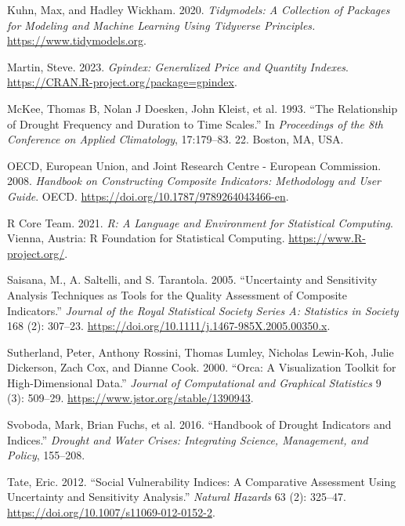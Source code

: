 \documentclass[
]{interact}
\newlength{\cslhangindent}
\newlength{\cslentryspacingunit} %
\newenvironment{CSLReferences}[2] %
 {%
  \setlength{\parindent}{0pt}
  \ifodd #1
  \let\oldpar\par
  \def\par{\hangindent=\cslhangindent\oldpar}
  \fi
  \setlength{\parskip}{#2\cslentryspacingunit}
 }%
 {}
\begin{document}
\begin{CSLReferences}{1}{0}
\leavevmode{}%
Kuhn, Max, and Hadley Wickham. 2020. \emph{Tidymodels: A Collection of
Packages for Modeling and Machine Learning Using Tidyverse Principles.}
\url{https://www.tidymodels.org}.

\leavevmode{}%
Martin, Steve. 2023. \emph{Gpindex: Generalized Price and Quantity
Indexes}. \url{https://CRAN.R-project.org/package=gpindex}.

\leavevmode{}%
McKee, Thomas B, Nolan J Doesken, John Kleist, et al. 1993. {``The
Relationship of Drought Frequency and Duration to Time Scales.''} In
\emph{Proceedings of the 8th Conference on Applied Climatology},
17:179--83. 22. Boston, MA, USA.

\leavevmode{}%
OECD, European Union, and Joint Research Centre - European Commission.
2008. \emph{Handbook on {Constructing} {Composite} {Indicators}:
{Methodology} and {User} {Guide}}. OECD.
\url{https://doi.org/10.1787/9789264043466-en}.

\leavevmode{}%
R Core Team. 2021. \emph{R: A Language and Environment for Statistical
Computing}. Vienna, Austria: R Foundation for Statistical Computing.
\url{https://www.R-project.org/}.

\leavevmode{}%
Saisana, M., A. Saltelli, and S. Tarantola. 2005. {``{Uncertainty and
Sensitivity Analysis Techniques as Tools for the Quality Assessment of
Composite Indicators}.''} \emph{Journal of the Royal Statistical Society
Series A: Statistics in Society} 168 (2): 307--23.
\url{https://doi.org/10.1111/j.1467-985X.2005.00350.x}.

\leavevmode{}%
Sutherland, Peter, Anthony Rossini, Thomas Lumley, Nicholas Lewin-Koh,
Julie Dickerson, Zach Cox, and Dianne Cook. 2000. {``Orca: {A}
{Visualization} {Toolkit} for {High}-{Dimensional} {Data}.''}
\emph{Journal of Computational and Graphical Statistics} 9 (3): 509--29.
\url{https://www.jstor.org/stable/1390943}.

\leavevmode{}%
Svoboda, Mark, Brian Fuchs, et al. 2016. {``Handbook of Drought
Indicators and Indices.''} \emph{Drought and Water Crises: Integrating
Science, Management, and Policy}, 155--208.

\leavevmode{}%
Tate, Eric. 2012. {``Social Vulnerability Indices: A Comparative
Assessment Using Uncertainty and Sensitivity Analysis.''} \emph{Natural
Hazards} 63 (2): 325--47.
\url{https://doi.org/10.1007/s11069-012-0152-2}.


\end{CSLReferences}
\end{document}
